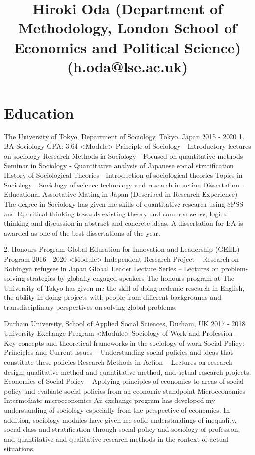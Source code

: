 \documentclass{article}
\title{Hiroki Oda
(Department of Methodology, London School of Economics and Political Science)
(h.oda@lse.ac.uk)}
\begin{document}
\maketitle

\section{Education}
The University of Tokyo, Department of Sociology, Tokyo, Japan      2015 - 2020
1. BA Sociology	                                                                                                           GPA: 3.64
<Module>
Principle of Sociology - Introductory lectures on sociology 
Research Methods in Sociology - Focused on quantitative methods 
Seminar in Sociology - Quantitative analysis of Japanese social stratification
History of Sociological Theories - Introduction of sociological theories
Topics in Sociology - Sociology of science technology and research in action
Dissertation - Educational Assortative Mating in Japan (Described in Research Experience)
The degree in Sociology has given me skills of quantitative research using SPSS and R, critical thinking towards existing theory and common sense, logical thinking and discussion in abstract and concrete ideas. A dissertation for BA is awarded as one of the best dissertations of the year.

2. Honours Program
Global Education for Innovation and Leadership (GEfIL) Program               2016 - 2020
<Module>
Independent Research Project – Research on Rohingya refugees in Japan
Global Leader Lecture Series – Lectures on problem-solving strategies by globally engaged speakers 
The honours program at The University of Tokyo has given me the skill of doing acdemic research in English, the ability in doing projects with people from different backgrounds and transdisciplinary perspectives on solving global problems.

Durham University, School of Applied Social Sciences, Durham, UK
2017 - 2018
University Exchange Program
<Module>
Sociology of Work and Profession – Key concepts and theoretical frameworks in the sociology of work
Social Policy: Principles and Current Issues – Understanding social policies and ideas that constitute these policies
Research Methods in Action – Lectures on research design, qualitative method and quantitative method, and actual research projects.
Economics of Social Policy – Applying principles of economics to areas of social policy and evaluate social policies from an economic standpoint
Microeconomics – Intermediate microeconomics
An exchange program has developed my understanding of sociology especially from the perspective of economics. In addition, sociology modules have given me solid understandings of inequality, social class and stratification through social policy and sociology of profession, and quantitative and qualitative research methods in the context of actual situations.
\end{document}
